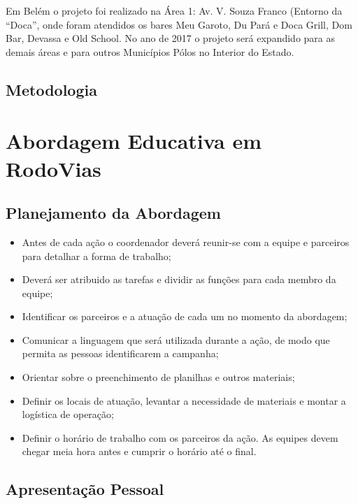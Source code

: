 Em Belém o projeto foi realizado na Área 1: Av. V. Souza Franco (Entorno da “Doca”, onde foram atendidos os bares Meu Garoto, Du Pará e Doca Grill, Dom Bar, Devassa e Old School. No ano de 2017 o projeto será expandido para as demais áreas e para outros Municípios Pólos no Interior do Estado.


\subsection{Metodologia}







\newpage
\section{Abordagem Educativa em RodoVias}
\subsection{Planejamento da Abordagem}

\begin{itemize}
\item Antes de cada ação o coordenador deverá reunir-se com a equipe e parceiros para detalhar a forma de  trabalho;
\item Deverá ser atribuido as tarefas e dividir as funções para cada membro da equipe;
\item Identificar os parceiros e a atuação de cada um no momento da abordagem;
\item Comunicar a linguagem que será utilizada durante a ação, de modo que permita as pessoas identificarem a campanha;
\item Orientar sobre o preenchimento de planilhas e outros materiais;
\item Definir os locais de atuação, levantar a necessidade de materiais e montar a logística de operação;
\item Definir o horário de trabalho com os parceiros da ação. As equipes devem chegar meia hora antes e cumprir o horário até o final.  
\end{itemize}

\subsection{Apresentação Pessoal}

